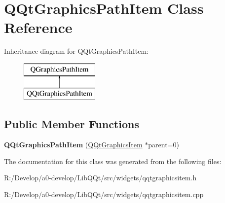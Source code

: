 \hypertarget{class_q_qt_graphics_path_item}{}\section{Q\+Qt\+Graphics\+Path\+Item Class Reference}
\label{class_q_qt_graphics_path_item}
Inheritance diagram for Q\+Qt\+Graphics\+Path\+Item\+:\begin{figure}[H]
\begin{center}
\leavevmode
\includegraphics[height=2.000000cm]{class_q_qt_graphics_path_item}
\end{center}
\end{figure}
\subsection*{Public Member Functions}
\begin{DoxyCompactItemize}
\item 
\mbox{\label{class_q_qt_graphics_path_item_aec2a89a1309d19849fe0c6cc61626b00}} 
{\bfseries Q\+Qt\+Graphics\+Path\+Item} (\mbox{\hyperlink{class_q_qt_graphics_item}{Q\+Qt\+Graphics\+Item}} $\ast$parent=0)
\end{DoxyCompactItemize}


The documentation for this class was generated from the following files\+:\begin{DoxyCompactItemize}
\item 
R\+:/\+Develop/a0-\/develop/\+Lib\+Q\+Qt/src/widgets/qqtgraphicsitem.\+h\item 
R\+:/\+Develop/a0-\/develop/\+Lib\+Q\+Qt/src/widgets/qqtgraphicsitem.\+cpp\end{DoxyCompactItemize}
